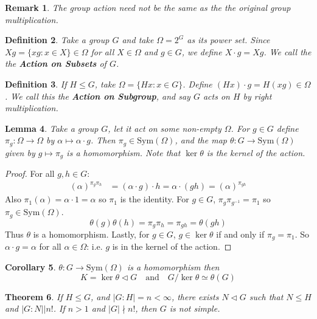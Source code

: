 \documentclass[a4paper,10pt]{article}
\newtheorem{thm}{Theorem}
\newtheorem{Def}[thm]{Definition}
\newtheorem{Cor}[thm]{Corollary}
\newtheorem{Lem}[thm]{Lemma}
\newtheorem{rem}[thm]{Remark}
\begin{document}
\begin{rem}
The group action need not be the same as the the original group multiplication.
\end{rem}

\begin{Def}
Take a group $G$ and take $\Omega = 2^G$ as its power set. Since $Xg = \{ xg : x \in X \} \in \Omega$ for all $X \in \Omega$ and $g \in G$, we define $X \cdot g = Xg$. We call the the \textbf{Action on Subsets} of $G$.
\end{Def}

\begin{Def}
If $H \leq G$, take $\Omega = \{ Hx : x \in G\}$. Define $(Hx) \cdot g = H(xg) \in \Omega$. We call this the \textbf{Action on Subgroup}, and say $G$ acts on $H$ by right multiplication.
\end{Def}

\begin{Lem}
Take a group $G$, let it act on some non-empty $\Omega$. For $g \in G$ define $\pi_g : \Omega \rightarrow \Omega$ by $\alpha \mapsto \alpha \cdot g$. Then $\pi_g \in \text{Sym} ( \Omega )$, and the map $\theta : G \rightarrow \text{Sym} (\Omega)$ given by $g \mapsto \pi_g$ is a homomorphism. Note that $\ker \theta$ is the kernel of the action.
\end{Lem}

\begin{proof}
For all $g,h \in G$:
\begin{align*}
(\alpha)^{\pi_g \pi_h} &= (\alpha \cdot g) \cdot h = \alpha \cdot (gh) = (\alpha )^{\pi_{gh}}
\end{align*}
Also $ \pi_1 (\alpha)= \alpha \cdot 1 = \alpha$ so $\pi_1$ is the identity. For $g \in G$, $\pi_g \pi_{g^{-1}} = \pi_1$ so $\pi_g \in \text{Sym}(\Omega)$. 
\[ \theta(g) \theta(h) = \pi_g \pi_h = \pi_{gh} = \theta(gh) \]
Thus $\theta$ is a homomorphism. Lastly, for $g \in G$, $ g \in \ker \theta$ if and only if $\pi_g = \pi_1$. So $\alpha \cdot g = \alpha$ for all $\alpha \in \Omega$: i.e. $g$ is in the kernel of the action. 
\end{proof}

\begin{Cor}
$\theta : G \rightarrow \text{Sym} (\Omega)$ is a homomorphism then
\[ K = \ker \theta \triangleleft G \quad \text{and} \quad G / \ker \theta \simeq  \theta (G)\]
\end{Cor}

\begin{thm}
If $H \leq G$, and $|G : H| = n < \infty$, there exists $N \triangleleft G$ such that $N \leq H$ and $|G : N| \big| n!$. If $n > 1$ and $|G| \nmid n!$, then $G$ is not simple.
\end{thm}
\end{document}
